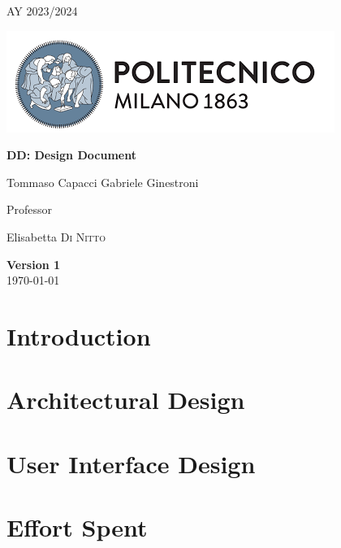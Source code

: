 \documentclass[table, 12pt]{article}
\begin{document}
\begin{titlepage}
    \centering
    {\scshape\large AY 2023/2024 \par}
    \vfill
    \includegraphics[scale=0.7]{Images/PolimiLogo.png}\par\vspace{1cm}
    \vspace{1cm}
    {\huge\bfseries DD\@: Design Document \par}
    \vspace{2cm}
    {\Large {Tommaso Capacci \quad Gabriele Ginestroni}\par}
    \vfill
    {\large Professor\par
        Elisabetta \textsc{Di Nitto}}
    \vfill
    {\large \textbf{Version 1}\\ \today \par}
\end{titlepage}
\thispagestyle{plain}
\mbox{}
\newpage
{}
\tableofcontents
\newpage
{}

\clearpage
{{\section{Introduction}}}
\label{sect:introduction}

\clearpage
{{\section{Architectural Design}}}
\label{sect:architectural}

\clearpage
{{\section{User Interface Design}}}
\label{sect:interface}

\clearpage
{{\section{Effort Spent}}}
\label{sect:effort}

\end{document}
